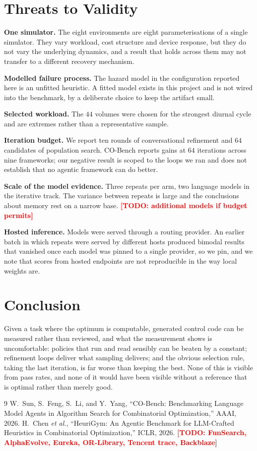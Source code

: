\documentclass[conference]{IEEEtran}
\newcommand{\TODO}[1]{\textcolor{red}{\textbf{[TODO: #1]}}}
\begin{document}
\section{Threats to Validity}

\textbf{One simulator.} The eight environments are eight parameterisations of a single
simulator. They vary workload, cost structure and device response, but they do not vary
the underlying dynamics, and a result that holds across them may not transfer to a
different recovery mechanism.

\textbf{Modelled failure process.} The hazard model in the configuration reported here is
an unfitted heuristic. A fitted model exists in this project and is not wired into the
benchmark, by a deliberate choice to keep the artifact small.

\textbf{Selected workload.} The $44$ volumes were chosen for the strongest diurnal cycle
and are extremes rather than a representative sample.

\textbf{Iteration budget.} We report ten rounds of conversational refinement and $64$
candidates of population search. CO-Bench reports gains at $64$ iterations across nine
frameworks; our negative result is scoped to the loops we ran and does not establish that
no agentic framework can do better.

\textbf{Scale of the model evidence.} Three repeats per arm, two language models in the
iterative track. The variance between repeats is large and the conclusions about memory
rest on a narrow base. \TODO{additional models if budget permits}

\textbf{Hosted inference.} Models were served through a routing provider. An earlier batch
in which repeats were served by different hosts produced bimodal results that vanished
once each model was pinned to a single provider, so we pin, and we note that scores from
hosted endpoints are not reproducible in the way local weights are.

\section{Conclusion}

Given a task where the optimum is computable, generated control code can be measured
rather than reviewed, and what the measurement shows is uncomfortable: policies that run
and read sensibly can be beaten by a constant; refinement loops deliver what sampling
delivers; and the obvious selection rule, taking the last iteration, is far worse than
keeping the best. None of this is visible from pass rates, and none of it would have been
visible without a reference that is optimal rather than merely good.

\begin{thebibliography}{9}
 W.~Sun, S.~Feng, S.~Li, and Y.~Yang, ``CO-Bench: Benchmarking Language
Model Agents in Algorithm Search for Combinatorial Optimization,'' AAAI, 2026.
 H.~Chen \emph{et al.}, ``HeuriGym: An Agentic Benchmark for LLM-Crafted
Heuristics in Combinatorial Optimization,'' ICLR, 2026.
\TODO{FunSearch, AlphaEvolve, Eureka, OR-Library, Tencent trace, Backblaze}
\end{thebibliography}
\end{document}
